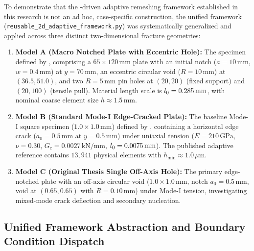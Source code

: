 To demonstrate that the \MISESERI-driven adaptive remeshing framework established in this research is not an ad hoc, case-specific construction, the unified framework (\texttt{reusable\_2d\_adaptive\_framework.py}) was systematically generalized and applied across three distinct two-dimensional fracture geometries:
\begin{enumerate}
  \item \textbf{Model A (Macro Notched Plate with Eccentric Hole):} The specimen defined by \citet[Section~4.3]{pandey2025}, comprising a $65 \times 120\,\mathrm{mm}$ plate with an initial notch ($a=10\,\mathrm{mm}$, $w=0.4\,\mathrm{mm}$) at $y=70\,\mathrm{mm}$, an eccentric circular void ($R=10\,\mathrm{mm}$) at $(36.5, 51.0)$, and two $R=5\,\mathrm{mm}$ pin holes at $(20, 20)$ (fixed support) and $(20, 100)$ (tensile pull). Material length scale is $l_0 = 0.285\,\mathrm{mm}$, with nominal coarse element size $h \approx 1.5\,\mathrm{mm}$.
  \item \textbf{Model B (Standard Mode-I Edge-Cracked Plate):} The baseline Mode-I square specimen ($1.0 \times 1.0\,\mathrm{mm}$) defined by \citet[Section~4.1]{pandey2025}, containing a horizontal edge crack ($a_0 = 0.5\,\mathrm{mm}$ at $y=0.5\,\mathrm{mm}$) under uniaxial tension ($E=210\,\mathrm{GPa}$, $\nu=0.30$, $G_c = 0.0027\,\mathrm{kN/mm}$, $l_0 = 0.0075\,\mathrm{mm}$). The published adaptive reference contains $13{,}941$ physical elements with $h_{\min} \approx 1.0\,\mu\mathrm{m}$.
  \item \textbf{Model C (Original Thesis Single Off-Axis Hole):} The primary edge-notched plate with an off-axis circular void ($1.0 \times 1.0\,\mathrm{mm}$, notch $a_0 = 0.5\,\mathrm{mm}$, void at $(0.65, 0.65)$ with $R=0.10\,\mathrm{mm}$) under Mode-I tension, investigating mixed-mode crack deflection and secondary nucleation.
\end{enumerate}

\subsection{Unified Framework Abstraction and Boundary Condition Dispatch}
\label{subsec:f1727_framework}

